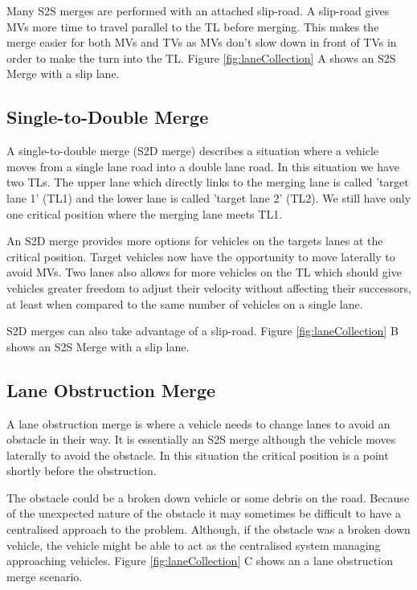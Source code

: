 Many S2S merges are performed with an attached slip-road. A slip-road gives MVs more time to travel parallel to the TL before merging. This makes the merge easier for both MVs and TVs as MVs don't slow down in front of TVs in order to make the turn into the TL. Figure \ref{fig:laneCollection} A shows an S2S Merge with a slip lane.

\subsection{Single-to-Double Merge}
\label{subsec:Single-to-Double Merge}
A single-to-double merge (S2D merge) describes a situation where a vehicle moves from a single lane road into a double lane road. In this situation we have two TLs. The upper lane which directly links to the merging lane is called 'target lane 1' (TL1) and the lower lane is called 'target lane 2' (TL2). We still have only one critical position where the merging lane meets TL1.

An S2D merge provides more options for vehicles on the targets lanes at the critical position. Target vehicles now have the opportunity to move laterally to avoid MVs. Two lanes also allows for more vehicles on the TL which should give vehicles greater freedom to adjust their velocity without affecting their successors, at least when compared to the same number of vehicles on a single lane.

S2D merges can also take advantage of a slip-road. Figure \ref{fig:laneCollection} B shows an S2S Merge with a slip lane.

\subsection{Lane Obstruction Merge}
\label{subsec:Lane Obstruction Merge}
A lane obstruction merge is where a vehicle needs to change lanes to avoid an obstacle in their way. It is essentially an S2S merge although the vehicle moves laterally to avoid the obstacle. In this situation the critical position is a point shortly before the obstruction. 

The obstacle could be a broken down vehicle or some debris on the road. Because of the unexpected nature of the obstacle it may sometimes be difficult to have a centralised approach to the problem. Although, if the obstacle was a broken down vehicle, the vehicle might be able to act as the centralised system managing approaching vehicles. Figure \ref{fig:laneCollection} C shows an a lane obstruction merge scenario.

